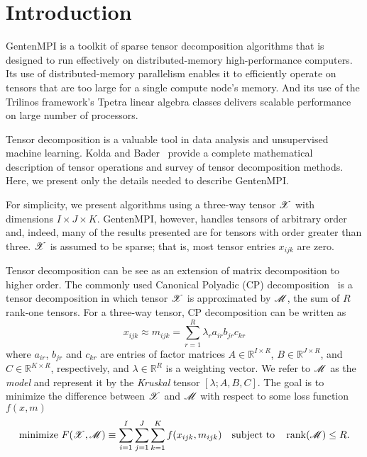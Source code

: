 
\chapter{Introduction} \label{sec:intro}

GentenMPI is a toolkit of sparse tensor decomposition algorithms that is
designed to run effectively on distributed-memory high-performance computers.
Its use of distributed-memory parallelism enables it to efficiently 
operate on tensors that are too large for a single compute node's memory.
And its use of the Trilinos framework's Tpetra linear algebra classes
delivers scalable performance on large number of processors.

Tensor decomposition is a valuable tool in data analysis and unsupervised
machine learning. 
Kolda and Bader~\cite{KB09} provide a complete mathematical 
description of tensor operations and 
survey of tensor decomposition methods. Here, we present only the details
needed to describe GentenMPI.

For simplicity, we present 
algorithms using a three-way tensor $\X$ with dimensions $I \times J \times K$.
GentenMPI, however, handles tensors of arbitrary order and, indeed,
many of the results presented are for tensors with order greater than three.
$\X$ is assumed to be sparse; that is, most tensor entries $x_{ijk}$ are zero.

Tensor decomposition can be see as an extension of matrix decomposition to
higher order.
The commonly used 
Canonical Polyadic (CP) decomposition~\cite{CC70,Harshman70}
is a tensor decomposition 
in which tensor $\X$ is approximated
by $\M$, the sum of $R$ rank-one tensors. 
For a three-way tensor, CP decomposition can be written as 
\begin{equation}
\label{eq:model}
x_{ijk} \approx m_{ijk} = \sum_{r=1}^R \lambda_r a_{ir} b_{jr} c_{kr}
\end{equation}
where $a_{ir}$, $b_{jr}$ and $c_{kr}$ are entries of factor matrices
$A \in \mathbb{R}^{I \times R}$, $B \in \mathbb{R}^{J \times R}$, and 
$C \in \mathbb{R}^{K \times R}$, respectively, and $\lambda \in \mathbb{R}^R$
is a weighting vector.  We refer to $\M$ as the \emph{model} and represent
it by the \emph{Kruskal} tensor $[\lambda; A, B, C]$.
The goal is to minimize the difference between $\X$ and $\M$ with respect 
to some loss function $f(x,m)$
\begin{equation}
  \label{eq:gcp}
  \text{minimize } F(\X,\M) \equiv \sum_{i=1}^{I} \sum_{j=1}^J \sum_{k=1}^K 
f(x_{ijk}, m_{ijk}) \qtext{subject to} \rank(\M) \leq R.
\end{equation}

